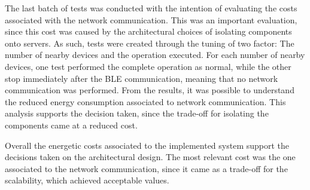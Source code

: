  
The last batch of tests was conducted with the intention of evaluating the costs associated with the network communication. This was an important evaluation, since this cost was caused by the architectural choices of isolating components onto servers. As such, tests were created through the tuning of two factor: The number of nearby devices and the operation executed. For each number of nearby devices, one test performed the complete operation as normal, while the other stop immediately after the BLE communication, meaning that no network communication was performed. From the results, it was possible to understand the reduced energy consumption associated to network communication. This analysis supports the decision taken, since the trade-off for isolating the components came at a reduced cost.  
 
 
Overall the energetic costs associated to the implemented system support the decisions taken on the architectural design. The most relevant cost was the one associated to the network communication, since it came as a trade-off for the scalability, which achieved acceptable values. 

\cleardoublepage